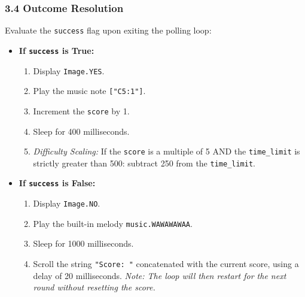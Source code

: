 \documentclass[12pt, a4paper]{article}
\begin{document}
\subsubsection*{3.4 Outcome Resolution}
Evaluate the \texttt{success} flag upon exiting the polling loop:
\begin{itemize}
    \item \textbf{If \texttt{success} is True:}
    \begin{enumerate}
        \item Display \texttt{Image.YES}.
        \item Play the music note \texttt{["C5:1"]}.
        \item Increment the \texttt{score} by 1.
        \item Sleep for 400 milliseconds.
        \item \textit{Difficulty Scaling:} If the \texttt{score} is a multiple of 5 AND the \texttt{time\_limit} is strictly greater than 500: subtract 250 from the \texttt{time\_limit}.
    \end{enumerate}
    \item \textbf{If \texttt{success} is False:}
    \begin{enumerate}
        \item Display \texttt{Image.NO}.
        \item Play the built-in melody \texttt{music.WAWAWAWAA}.
        \item Sleep for 1000 milliseconds.
        \item Scroll the string \texttt{"Score: "} concatenated with the current score, using a delay of 20 milliseconds. \textit{Note: The loop will then restart for the next round without resetting the score.}
    \end{enumerate}
\end{itemize}
\end{document}
